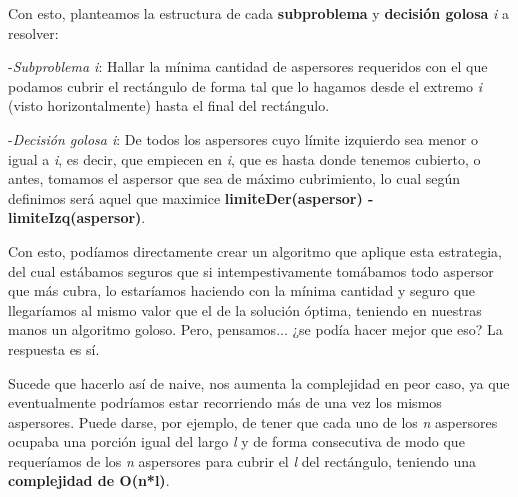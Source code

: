\documentclass[./main.tex]{subfiles}
\begin{document}
Con esto, planteamos la estructura de cada \textbf{subproblema} y \textbf{decisión golosa} \textit{i} a resolver: \newline

-\textit{Subproblema i}: Hallar la mínima cantidad de aspersores requeridos con el que podamos cubrir el  rectángulo de forma tal que lo hagamos desde el extremo \textit{i} (visto horizontalmente) hasta el final del rectángulo.\newline

-\textit{Decisión golosa i}: De todos los aspersores cuyo límite izquierdo sea menor o igual a \textit{i}, es decir, que empiecen en \textit{i}, que es hasta donde tenemos cubierto, o antes, tomamos el aspersor que sea de máximo cubrimiento, lo cual según definimos será aquel que maximice \textbf{limiteDer(aspersor) - limiteIzq(aspersor)}. \newline

Con esto, podíamos directamente crear un algoritmo que aplique esta estrategia, del cual estábamos seguros que si intempestivamente tomábamos todo aspersor que más cubra, lo estaríamos haciendo con la mínima cantidad y seguro que llegaríamos al mismo valor que el de la solución óptima, teniendo en nuestras manos un algoritmo goloso. Pero, pensamos... ¿se podía hacer mejor que eso? La respuesta es sí. \newline

Sucede que hacerlo así de naive, nos aumenta la complejidad en peor caso, ya que eventualmente podríamos estar recorriendo más de una vez los mismos aspersores. Puede darse, por ejemplo, de tener que cada uno de los \textit{n} aspersores ocupaba una porción igual del largo \textit{l} y de forma consecutiva de modo que requeríamos de los \textit{n} aspersores para cubrir el \textit{l} del rectángulo, teniendo una \textbf{complejidad de O(n*l)}. \newline
\end{document}
